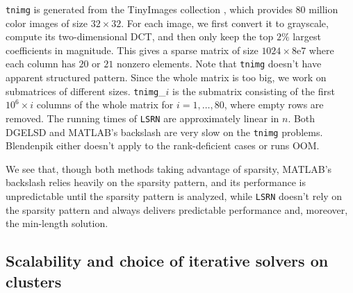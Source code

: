 \documentclass{siamltex}
\begin{document}
\texttt{tnimg} is generated from the TinyImages collection
\cite{torralba2008tiny}, which provides $80$ million color images of size $32
\times 32$. For each image, we first convert it to grayscale, compute its
two-dimensional DCT, and then only keep the top $2\%$ largest coefficients in
magnitude. This gives a sparse matrix of size $1024 \times 8\mathrm{e}7$ where
each column has $20$ or $21$ nonzero elements. Note that \texttt{tnimg} doesn't
have apparent structured pattern. Since the whole matrix is too big, we work on
submatrices of different sizes. \texttt{tnimg}\_$i$ is the submatrix consisting
of the first $10^6 \times i$ columns of the whole matrix for $i=1,\ldots,80$,
where empty rows are removed. The running times of \texttt{LSRN} are
approximately linear in $n$. Both DGELSD and MATLAB's backslash are very slow on
the \texttt{tnimg} problems. Blendenpik either doesn't apply to the
rank-deficient cases or runs OOM.

We see that, though both methods taking advantage of sparsity, MATLAB's
backslash relies heavily on the sparsity pattern, and its performance is
unpredictable until the sparsity pattern is analyzed, while \texttt{LSRN}
doesn't rely on the sparsity pattern and always delivers predictable performance
and, moreover, the min-length solution.

\subsection{Scalability and choice of iterative solvers on clusters}
\label{sec:scalability}
\end{document}
